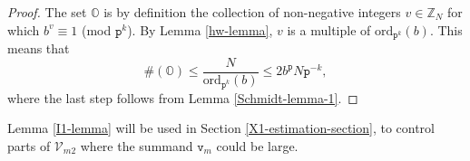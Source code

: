 \documentclass[12pt, twoside]{article}
\theoremstyle{definition}
\numberwithin{equation}{section}
\begin{document}
\begin{proof} 
The set $\mathbb O$ is by definition the collection of non-negative integers $v \in \mathbb Z_{N}$ for which $b^{v} \equiv 1$ (mod $\mathtt p^k$). By Lemma \ref{hw-lemma}, 
$v$ is a multiple of $\text{ord}_{\mathtt p^k}(b)$. This means that 
\[ \#(\mathbb O) \leq \frac{N}{\text{ord}_{\mathtt p^k}(b)} \leq {2 b^{\mathtt p} N}{\mathtt p^{-k}}, \]
where the last step follows from Lemma \ref{Schmidt-lemma-1}.   
\end{proof}  
\noindent Lemma \ref{I1-lemma} will be used in Section \ref{X1-estimation-section}, to control parts of $\mathcal V_{m2}$ where the summand $\mathtt v_m$ could be large. 
\end{document}
